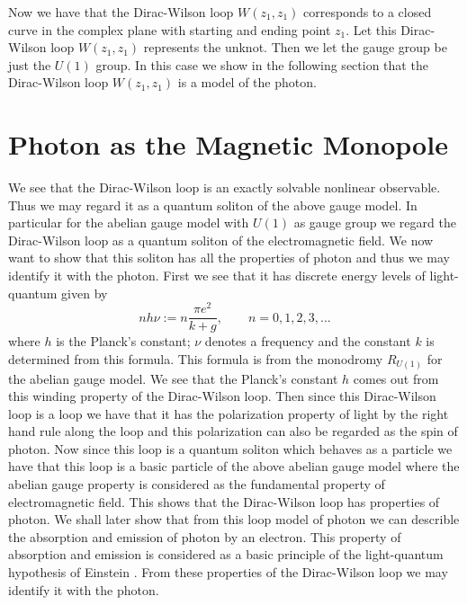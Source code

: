 \documentclass[a4paper,a4paper]{article}
\begin{document}
Now
we have that the Dirac-Wilson loop $W(z_1, z_1)$ corresponds to a closed
curve in the complex plane with starting and ending
point $z_1$. 
Let this Dirac-Wilson loop $W(z_1, z_1)$ represents the unknot. Then we let the gauge group be just the $U(1)$ group. In this case we show in the following section that the Dirac-Wilson loop $W(z_1, z_1)$ is a model of the photon.

\section{Photon as the Magnetic Monopole}

We see that the Dirac-Wilson loop is an exactly solvable nonlinear observable. Thus we may regard it as a quantum soliton of the above gauge model. In particular for the abelian gauge model with $U(1)$ as gauge group we regard the Dirac-Wilson loop as a quantum soliton of the electromagnetic field. We now want to show that this soliton has all the properties of photon and thus we may identify it with the photon. First we see that it has discrete energy levels of light-quantum given by
\begin{equation} 
n h \nu :=n \frac{\pi e^2}{k+g}, \qquad n=0,1,2,3, . . .
\label{planck}
\end{equation}
 where $h$ is the Planck's constant; $\nu$ denotes a frequency and the constant $k$ is determined from this formula. This formula is from the monodromy $R_{U(1)}$ for the abelian gauge model. We see that the Planck's constant $h$ comes out from this winding property of the Dirac-Wilson loop. Then since this Dirac-Wilson loop is a loop we have that it has the polarization property of light by the right hand rule along the loop and this polarization can also be regarded as the spin of photon. Now since this loop is a quantum soliton which behaves as a particle we have that this loop is a basic particle of the above abelian gauge model where the abelian gauge property is considered as the fundamental property of electromagnetic field. This shows that the Dirac-Wilson loop has properties of photon. We shall later show that from this loop model of photon we can describle the absorption and emission of photon by an electron. This property of absorption and emission is considered as a basic principle of the light-quantum hypothesis of Einstein \cite{Pai}. From these properties of the Dirac-Wilson loop we may identify it with the photon.
\end{document}
